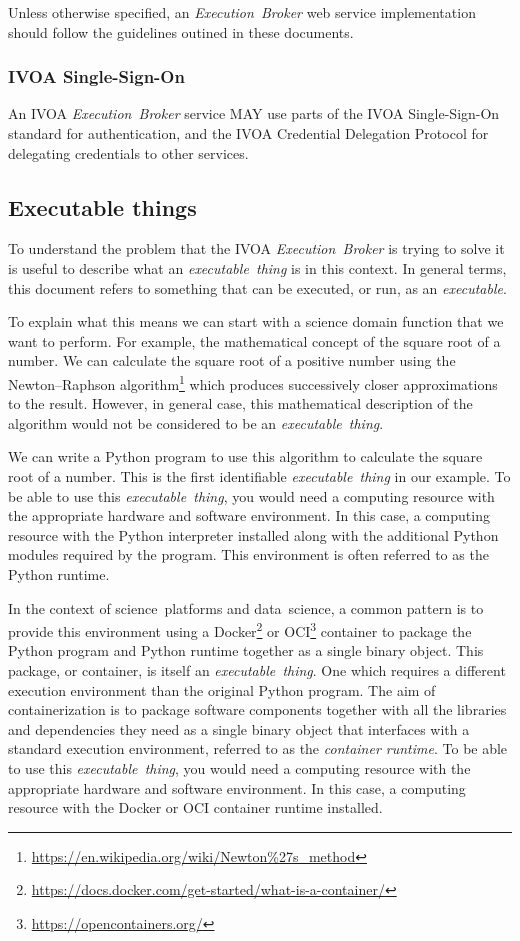 \documentclass[11pt,a4paper]{ivoa}
\newcommand{\webservice} {web service}
\newcommand{\ivoa} {IVOA}
\newcommand{\executionbroker} {\textit{Execution~Broker}}
\newcommand{\executable} {\textit{executable}}
\newcommand{\executablething}[1] {\textit{executable~thing#1}}
\newcommand{\python} {Python}
\newcommand{\pythonprogram} {Python program}
\newcommand{\ocicontainer} {OCI container}
\newcommand{\docker} {Docker}
\newcommand{\footurl}[1] {\footnote{\url{#1}}}
\newcommand{\datascience} {data~science}
\newcommand{\scienceplatform}[1] {science~platform#1}
\begin{document}
Unless otherwise specified, an \executionbroker{} \webservice{} implementation
should follow the guidelines outined in these documents.

\subsubsection{IVOA Single-Sign-On}
\label{subsub-ivoa-sso}

An \ivoa{} \executionbroker{} service MAY use parts of the
\ivoa{} Single-Sign-On standard\citep{2017ivoa.spec.0524T}
for authentication, and the
\ivoa{} Credential Delegation Protocol \citep{2010ivoa.spec.0218P}
for delegating credentials to other services.

\subsection{Executable things}
\label{sub-executablething}

To understand the problem that the \ivoa{} \executionbroker{} is trying to solve
it is useful to describe what an \executablething{} is in this context.
In general terms, this document refers to something that can be executed, or run,
as an \executable{}.

To explain what this means we can start with a science domain function that we want to perform.
For example, the mathematical concept of the square root of a number.
We can calculate the square root of a positive number using the Newton–Raphson
algorithm\footurl{https://en.wikipedia.org/wiki/Newton\%27s_method}
which produces successively closer approximations to the result.
However, in general case, this mathematical description of the algorithm would not be
considered to be an \executablething{}.

We can write a \pythonprogram{} to use this algorithm to calculate the square root of a number.
This is the first identifiable \executablething{} in our example.
To be able to use this \executablething{}, you would need a computing resource with the appropriate
hardware and software environment. In this case, a computing resource with the \python{} interpreter
installed along with the additional \python{} modules required by the program.
This environment is often referred to as the \python{} runtime.

In the context of \scienceplatform{s} and \datascience{}, a common pattern is to provide this environment
using a Docker\footurl{https://docs.docker.com/get-started/what-is-a-container/}
or OCI\footurl{https://opencontainers.org/} container
to package the \pythonprogram{} and \python{} runtime together as a single binary object.
This package, or container, is itself an \executablething{}. One which requires a different execution
environment than the original \pythonprogram{}.
The aim of containerization is to package software components together with all the libraries and dependencies
they need as a single binary object that interfaces with a standard execution environment,
referred to as the \textit{container runtime}.
To be able to use this \executablething{}, you would need a computing resource with the appropriate
hardware and software environment. In this case, a computing resource with the \docker{} or \ocicontainer{}
runtime installed.
\end{document}

